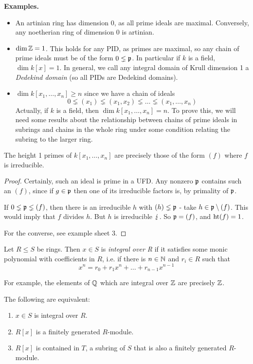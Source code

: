 \documentclass[10pt,a4paper]{article}
\begin{document}
\textbf{Examples.}
\begin{itemize}
  \item An artinian ring has dimension 0, as all prime ideals are maximal. Conversely, any noetherian ring of dimension 0 is artinian.
  \item $\dim\mathbb{Z} = 1$. This holds for any PID, as primes are maximal, so any chain of prime ideals must be of the form $0 \lneq \mathfrak{p}$. In particular if $k$ is a field, $\dim k[x]= 1$. In general, we call any integral domain of Krull dimension 1 a \emph{Dedekind domain} (so all PIDs are Dedekind domains).
  \item $\dim k[x_1, \ldots, x_n] \geq n$ since we have a chain of ideals
  \[0 \lneq (x_1) \lneq (x_1, x_2)\lneq \ldots \lneq (x_1, \ldots, x_n)\]
  Actually, if $k$ is a field, then $\dim k[x_1, \ldots, x_n] = n$. To prove this, we will need some results about the relationship between chains of prime ideals in subrings and chains in the whole ring under some condition relating the subring to the larger ring.
\end{itemize}
\begin{lemma}
  The height 1 primes of $k[x_1, \ldots, x_n]$ are precisely those of the form $(f)$ where $f$ is irreducible.
\end{lemma}
\begin{proof}
  Certainly, such an ideal is prime in a UFD. Any nonzero $\mathfrak{p}$ contains such an $(f)$, since if $g \in \mathfrak{p}$ then one of its irreducible factors is, by primality of $\mathfrak{p}$.

  If $0 \lneq \mathfrak{p} \lneq (f)$, then there is an irreducible $h$ with $(h)\lneq \mathfrak{p}$ - take $h \in \mathfrak{p}\setminus (f)$. This would imply that $f$ divides $h$. But $h$ is irreducible $\lightning$. So $\mathfrak{p} = (f)$, and $\operatorname{ht} (f) = 1$.

  For the converse, see example sheet 3.
\end{proof}
\begin{definition}
  Let $R \leq S$ be rings. Then $x \in S$ is \emph{integral over R} if it satisfies some monic polynomial with coefficients in $R$, i.e. if there is $n \in \mathbb{N}$ and $r_i \in R$ such that
  \[x^n = r_0 + r_1x^n + \ldots +r_{n-1}x^{n-1}\]
\end{definition}
For example, the elements of $\mathbb{Q}$ which are integral over $\mathbb{Z}$ are precisely $\mathbb{Z}$.
\begin{lemma}
  The following are equivalent:
  \begin{enumerate}
    \item $x\in S$ is integral over $R$.
    \item $R[x]$ is a finitely generated $R$-module.
    \item $R[x]$ is contained in $T$, a subring of $S$ that is also a finitely generated $R$-module.
  \end{enumerate}
\end{lemma}
\end{document}
